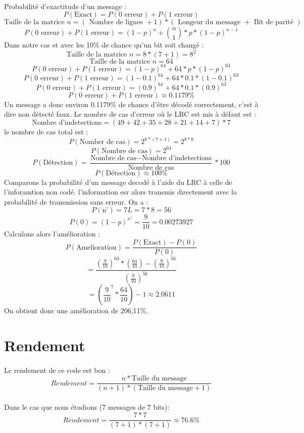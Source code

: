         \paragraph{}
Probabilité d'exactitude d'un message :
\[  P(\text{Exact}) = P(\text{0 erreur}) + P(\text{1 erreur}) \]
\[ \text{Taille de la matrice } n = ( \text{ Nombre de lignes } + 1 ) * ( \text{ Longeur du message } + \text{ Bit de parité } ) \]
\[ P(\text{0 erreur}) + P(\text{1 erreur}) = (1-p)^{n} + {n\choose 1}*p*(1-p)^{n-1} \]
Dans notre cas et avec les 10\% de chance qu'un bit soit changé :
\[ \text{Taille de la matrice } n = 8*(7+1) = 8^{2} \]
\[ \text{Taille de la matrice } n = 64 \]
\[ P(\text{0 erreur}) + P(\text{1 erreur}) = (1-p)^{64} + 64*p*(1-p)^{63} \]
\[ P(\text{0 erreur}) + P(\text{1 erreur}) = (1-0.1)^{64} + 64*0.1*(1-0.1)^{63} \]
\[ P(\text{0 erreur}) + P(\text{1 erreur}) = (0.9)^{64} + 64*0.1*(0.9)^{63} \]
\[ P(\text{0 erreur}) + P(\text{1 erreur}) \approx 0.1179\% \]
Un message a donc environ 0.1179\% de chance d'être décodé correctement, c'est à dire non détecté faux.
Le nombre de cas d'erreur où le LRC est mis à défaut est :
\[  \text{Nombre d'indetections} = (49+42+35+28+21+14+7)*7 \]
le nombre de cas total est  :
\[  P(\text{Nomber de cas}) = 2^{8*(7+1)} = 2^{8*8} \]
\[  P(\text{Nombre de cas}) = 2^{64} \]
\[  P(\text{Détection}) = \frac{\text{Nombre de cas} - \text{Nombre d'indetections}}{\text{Nombre de cas}}*100 \]
\[  P(\text{Détection}) \approx 100\% \]
Comparons la probabilité d'un message decodé à l'aide du LRC à celle de l'inforamtion non codé.
l'information esr alors transmis directement avec la probabilité de transmission sans erreur.
On a :
\[  P(\text{n'}) = 7L=7*8=56 \]
\[  P(\text{0}) = (1-p)^{n'}=\frac{9}{10} = 0.00273927\]
Calculons alors l'amélioration :
\[  P(\text{Amelioration}) = \frac{P(\text{Exact}) - P(\text{0})}{P(\text{0})} \]
\[ =\frac{(\frac{9}{10})^{63}*(\frac{64}{10})-(\frac{9}{10})^{56}}{(\frac{9}{10})^{56}} \]
\[ =(\frac{9}{10}^{7}*\frac{64}{10})-1 \approx 2.0611 \]
On obtient donc une amélioration de 206,11\%.
    \section{Rendement}

        \paragraph{}
Le rendement de ce code est bon :
\[  Rendement = \frac{n*\text{Taille du message}}{(n+1)*(\text{Taille du message}+1)} \]
        \paragraph{}
Dans le cas que nous étudions (7 messages de 7 bits):
\[  Rendement = \frac{7*7}{(7+1)*(7+1)} \approx 76.6\% \]
